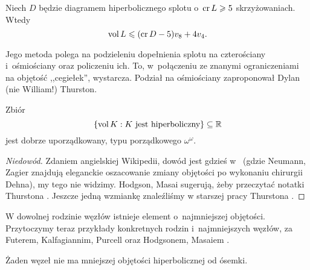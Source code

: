 \begin{proposition}
    Niech $D$ będzie diagramem hiperbolicznego splotu o~$\operatorname{cr} L \geqslant 5$ skrzyżowaniach.
    Wtedy
    \begin{equation}
        \operatorname{vol} L \leqslant (\operatorname{cr} D - 5) v_8 + 4v_4.
    \end{equation}
\end{proposition}

Jego metoda polega na podzieleniu dopełnienia splotu na czterościany i~ośmiościany oraz policzeniu ich.
To, w~połączeniu ze znanymi ograniczeniami na objętość ,,cegiełek'', wystarcza.
Podział na ośmiościany zaproponował Dylan (nie William!) Thurston.
%

\begin{proposition}
    Zbiór
    \begin{equation}
        \{\operatorname{vol} K: K \textrm{ jest hiperboliczny}\} \subseteq \mathbb R
    \end{equation}
    jest dobrze uporządkowany, typu porządkowego $\omega^\omega$.
\end{proposition}

\begin{proof}[Niedowód]
    Zdaniem angielskiej Wikipedii, dowód jest gdzieś w~\cite{neumann85} (gdzie Neumann, Zagier znajdują eleganckie oszacowanie zmiany objętości po wykonaniu chirurgii Dehna), my tego nie widzimy.
%
%
    Hodgson, Masai \cite{hodgson13} sugerują, żeby przeczytać notatki Thurstona \cite{thurston02}.
%
%
    Jeszcze jedną wzmiankę znaleźliśmy w starszej pracy Thurstona \cite[s. 365]{thurston82}.
\end{proof}

W dowolnej rodzinie węzłów istnieje element o~najmniejszej objętości.
Przytoczymy teraz przykłady konkretnych rodzin i~najmniejszych węzłów, za Futerem, Kalfagiannim, Purcell \cite[s. 16-17]{purcell19} oraz Hodgsonem, Masaiem \cite[s. 296]{hodgson13}.
%
%
%
%
%

\begin{proposition}
%
%
\label{prp:eight_smallest_volume}%
    Żaden węzeł nie ma mniejszej objętości hiperbolicznej od ósemki.
\end{proposition}

